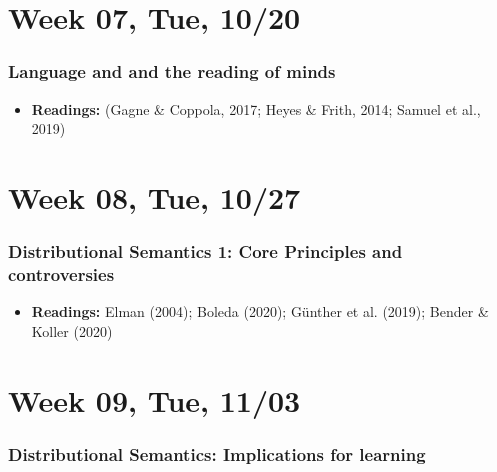 \documentclass[11pt,man]{article}
\providecommand{\tightlist}{%
  \setlength{\itemsep}{0pt}\setlength{\parskip}{0pt}}
\begin{document}
\hypertarget{week-07-tue-1020}{%
\section{Week 07, Tue, 10/20}\label{week-07-tue-1020}}

\hypertarget{language-and-and-the-reading-of-minds}{%
\subsubsection{Language and and the reading of
minds}\label{language-and-and-the-reading-of-minds}}

\begin{itemize}
\tightlist
\item
  \textbf{Readings:} (Gagne \& Coppola, 2017; Heyes \& Frith, 2014;
  Samuel et al., 2019)
\end{itemize}

\hypertarget{week-08-tue-1027}{%
\section{Week 08, Tue, 10/27}\label{week-08-tue-1027}}

\hypertarget{distributional-semantics-1-core-principles-and-controversies}{%
\subsubsection{Distributional Semantics 1: Core Principles and
controversies}\label{distributional-semantics-1-core-principles-and-controversies}}

\begin{itemize}
\tightlist
\item
  \textbf{Readings:} Elman (2004); Boleda (2020); Günther et al. (2019);
  Bender \& Koller (2020)
\end{itemize}

\hypertarget{week-09-tue-1103}{%
\section{Week 09, Tue, 11/03}\label{week-09-tue-1103}}

\hypertarget{distributional-semantics-implications-for-learning}{%
\subsubsection{Distributional Semantics: Implications for
learning}\label{distributional-semantics-implications-for-learning}}
\end{document}
